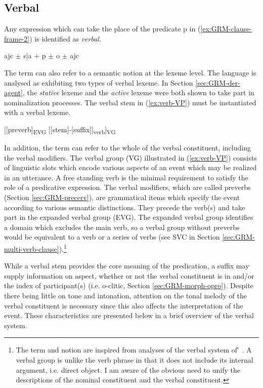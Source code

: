 \begin{exe}
\begin{exe}
\begin{exe}
\begin{exe}
\begin{exe}
\begin{exe}
\begin{exe}
\begin{exe}
\begin{exe}
\begin{exe}
\begin{exe}
\largerpage[-2]
\section{Verbal}
\label{sec:GRM-verbals}


Any expression which can take the place of  the predicate {\sc p} in  (\ref{ex:GRM-clause-frame-2}) is identified as \textit{verbal}.


\begin{exe}
  \ex\label{ex:GRM-clause-frame-2} 
 {\sc ajc}  $\pm$ {\sc s|a}  $+$ {\sc p} $\pm$ {\sc o} $\pm$ {\sc ajc} 
\end{exe}

The term  can also refer to a semantic notion at the lexeme level. The language is analysed as exhibiting two types of verbal lexeme. In Section \ref{sec:GRM-der-agent},  the {\it stative} lexeme and the {\it active} lexeme were both shown to take  part in nominalization processes. The verbal stem in (\ref{ex:verb-VP})  must be instantiated with a verbal lexeme. 

\ea\label{ex:verb-VP}
{\rm [[{preverb}]\textsubscript{EVG} [[{stem}]-[{suffix}]]\textsubscript{verb}]\textsubscript{VG}}
\z


In addition, the term  can refer to the whole of the verbal constituent, including the verbal modifiers. The verbal group   (VG) illustrated in (\ref{ex:verb-VP}) consists of linguistic slots which encode   various aspects of an event  which may be realized in an utterance. A free standing verb is the minimal requirement to satisfy the role of a predicative expression. The verbal modifiers, which are called preverbs (Section \ref{sec:GRM-precerv}),  are grammatical items which specify the event according to various  semantic distinctions. They precede the  verb(s) and take part in the expanded verbal group  (EVG). The expanded verbal group identifies  a domain which excludes the main verb, so a  verbal group without preverbs would  be equivalent to a verb or a series of verbs (see SVC in Section \ref{sec:GRM-multi-verb-clause}).\footnote{The term and notion are inspired from analyses of the verbal system of ̃ \citep{Daku70}. A verbal group is unlike the verb phrase in that it does not include its internal argument, i.e. direct object. I am aware of the obvious need to unify the descriptions of the nominal constituent and the verbal constituent.} 

While a verbal stem provides the core meaning of the predication,  a suffix may supply information on  aspect, whether or not the verbal constituent is in  and/or the index of participant(s) (i.e. {\sc o}-clitic, Section \ref{sec:GRM-morph-opro}).  Despite there being little  on tone and intonation, attention on the tonal melody of the verbal constituent is necessary since this also affects the interpretation of the event. These characteristics are presented below in a brief overview of the verbal system. 


\end{exe}
\end{exe}
\end{exe}
\end{exe}
\end{exe}
\end{exe}
\end{exe}
\end{exe}
\end{exe}
\end{exe}
\end{exe}
